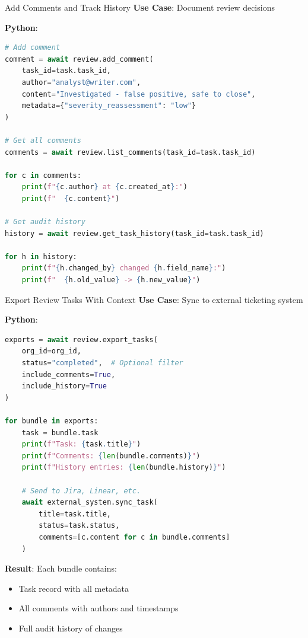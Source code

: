 \documentclass[aspectratio=169]{beamer}
\begin{document}
\begin{frame}[fragile]{Add Comments and Track History}
\textbf{Use Case}: Document review decisions

\textbf{Python}:
\begin{lstlisting}[language=Python]
# Add comment
comment = await review.add_comment(
    task_id=task.task_id,
    author="analyst@writer.com",
    content="Investigated - false positive, safe to close",
    metadata={"severity_reassessment": "low"}
)

# Get all comments
comments = await review.list_comments(task_id=task.task_id)

for c in comments:
    print(f"{c.author} at {c.created_at}:")
    print(f"  {c.content}")

# Get audit history
history = await review.get_task_history(task_id=task.task_id)

for h in history:
    print(f"{h.changed_by} changed {h.field_name}:")
    print(f"  {h.old_value} -> {h.new_value}")
\end{lstlisting}
\end{frame}

\begin{frame}[fragile]{Export Review Tasks With Context}
\textbf{Use Case}: Sync to external ticketing system

\textbf{Python}:
\begin{lstlisting}[language=Python]
exports = await review.export_tasks(
    org_id=org_id,
    status="completed",  # Optional filter
    include_comments=True,
    include_history=True
)

for bundle in exports:
    task = bundle.task
    print(f"Task: {task.title}")
    print(f"Comments: {len(bundle.comments)}")
    print(f"History entries: {len(bundle.history)}")
    
    # Send to Jira, Linear, etc.
    await external_system.sync_task(
        title=task.title,
        status=task.status,
        comments=[c.content for c in bundle.comments]
    )
\end{lstlisting}

\textbf{Result}: Each bundle contains:
\begin{itemize}
  \item Task record with all metadata
  \item All comments with authors and timestamps
  \item Full audit history of changes
\end{itemize}
\end{frame}
\end{document}
